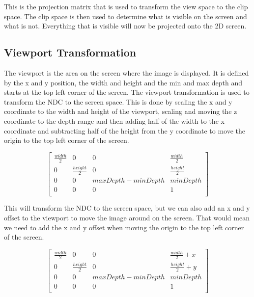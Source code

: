 \documentclass[12pt]{report} \usepackage{preamble}
\begin{document}
This is the projection matrix that is used to transform the view space to the clip space.
The clip space is then used to determine what is visible on the screen and what is not.
Everything that is visible will now be projected onto the 2D screen.

\subsection{Viewport Transformation}

The viewport is the area on the screen where the image is displayed.
It is defined by the x and y position, the width and height and the
min and max depth and starts at the top left corner of the screen.
The viewport transformation is used to transform the NDC to the screen space.
This is done by scaling the x and y coordinate to the width and height of the viewport,
scaling and moving the z coordinate to the depth range and then adding
half of the width to the x coordinate and subtracting half of the height from the y coordinate
to move the origin to the top left corner of the screen.

\[
	\begin{bmatrix}
		\frac{width}{2} & 0                & 0                   & \frac{width}{2}  \\
		0               & \frac{height}{2} & 0                   & \frac{height}{2} \\
		0               & 0                & maxDepth - minDepth & minDepth         \\
		0               & 0                & 0                   & 1                \\
	\end{bmatrix}
\]

This will transform the NDC to the screen space, but we can also add an x
and y offset to the viewport to move the image around on the screen.
That would mean we need to add the x and y offset when moving
the origin to the top left corner of the screen.

\[
	\begin{bmatrix}
		\frac{width}{2} & 0                & 0                   & \frac{width}{2} + x  \\
		0               & \frac{height}{2} & 0                   & \frac{height}{2} + y \\
		0               & 0                & maxDepth - minDepth & minDepth             \\
		0               & 0                & 0                   & 1                    \\
	\end{bmatrix}
\]
\end{document}
